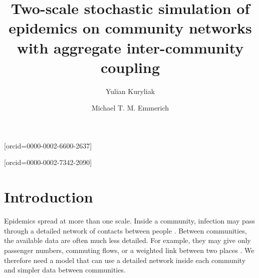 \documentclass[a4paper,fleqn]{cas-sc}
\begin{document}
\let\WriteBookmarks\relax
\def\floatpagepagefraction{1}
\def\textpagefraction{.001}


\title[mode=title]{Two-scale stochastic simulation of epidemics on community networks with aggregate inter-community coupling}

\author[1]{Yulian Kuryliak}[orcid=0000-0002-6600-2637]
\cormark[1]

\author[2]{Michael T. M. Emmerich}[orcid=0000-0002-7342-2090]


\maketitle

\begingroup\color{black}
\hypersetup{citecolor=black,linkcolor=black}

\section{Introduction}
\label{sec:introduction}

Epidemics spread at more than one scale. Inside a community, infection may pass through a detailed network of contacts between people \citep{keeling2005,pastorsatorras2015,kiss2017}. Between communities, the available data are often much less detailed. For example, they may give only passenger numbers, commuting flows, or a weighted link between two places \citep{balcan2009,barbosa2018human}. We therefore need a model that can use a detailed network inside each community and simpler data between communities.
\end{document}
